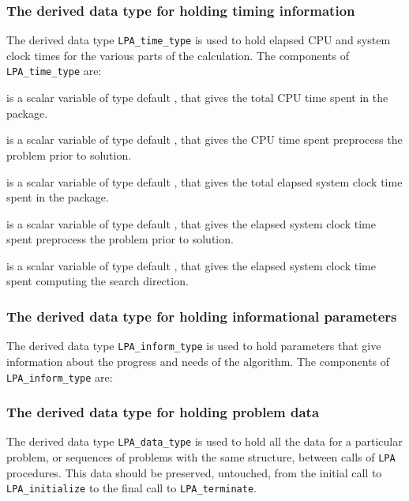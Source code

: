 \documentclass{galahad}
\newcommand{\packagename}{LPA}
\begin{document}



\subsubsection{The derived data type for holding timing
 information}\label{typetime}
The derived data type
{\tt \packagename\_time\_type}
is used to hold elapsed CPU and system clock times for the various parts of
the calculation. The components of
{\tt \packagename\_time\_type}
are:
\begin{description}
 is a scalar variable of type default \realdp, that gives
 the total CPU time spent in the package.

 is a scalar variable of type default \realdp, that gives
 the CPU time spent preprocess the problem prior to solution.

 is a scalar variable of type default \realdp, that gives
 the total elapsed system clock time spent in the package.

 is a scalar variable of type default \realdp, that gives
 the elapsed system clock time spent preprocess the problem prior to solution.

 is a scalar variable of type default \realdp, that gives
 the elapsed system clock time spent computing the search direction.

\end{description}


\subsubsection{The derived data type for holding informational
 parameters}\label{typeinform}
The derived data type
{\tt \packagename\_inform\_type}
is used to hold parameters that give information about the progress and needs
of the algorithm. The components of
{\tt \packagename\_inform\_type}
are:




\subsubsection{The derived data type for holding problem data}\label{typedata}
The derived data type
{\tt \packagename\_data\_type}
is used to hold all the data for a particular problem,
or sequences of problems with the same structure, between calls of
{\tt \packagename} procedures.
This data should be preserved, untouched, from the initial call to
{\tt \packagename\_initialize}
to the final call to
{\tt \packagename\_terminate}.
\end{document}
